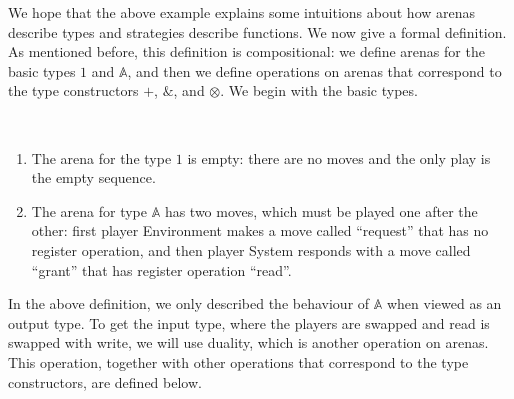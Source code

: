\documentclass[10pt,a4paper]{amsart}
\numberwithin{equation}{section}
\theoremstyle{plain}
\newcommand{\atoms}{\mathbb A}
\begin{document}
We hope that the above example explains some intuitions about how arenas describe types and strategies describe functions. We now give a formal definition. As mentioned before, this definition is compositional: we define arenas for the basic types $1$ and $\atoms$, and then we define operations on arenas that correspond to the type constructors  $+$, $\&$, and $\otimes$. We begin with the basic types.


\begin{definition}[Arenas for $1$ and $\atoms$]\label{def:arenas-without-atoms-or-functions} \ 
    \begin{enumerate}
        \item     The arena for the type $1$ is empty: there are no moves and the only play is the empty sequence. 
        \item The arena for type $\atoms$ has two moves, which must be played one after the other: first player Environment makes a move called ``request'' that has no register operation, and then player System responds with  a move called ``grant'' that has register operation ``read''.
    \end{enumerate}
\end{definition}

In the above definition, we only described the behaviour of $\atoms$ when viewed as an output type. To get the input type, where the players are swapped and read is swapped with write, we will use duality, which is another operation on arenas. This operation, together with other operations that correspond to the type constructors, are defined below.   
\end{document}
